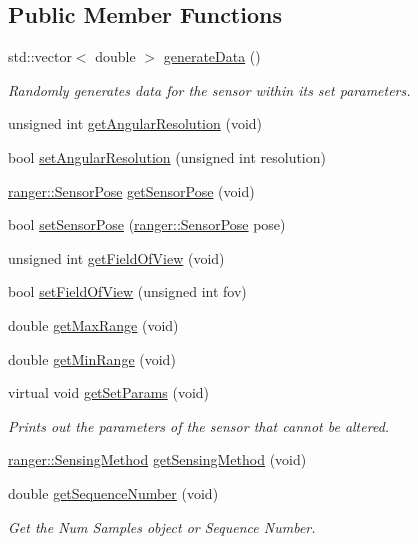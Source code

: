 \subsection*{Public Member Functions}
\begin{DoxyCompactItemize}
\item 
std\+::vector$<$ double $>$ \hyperlink{classRanger_a2b76dc3e21da8a7abac830d09fa81241}{generate\+Data} ()
\begin{DoxyCompactList}\small\item\em Randomly generates data for the sensor within its set parameters. \end{DoxyCompactList}\item 
unsigned int \hyperlink{classRanger_a95b5013ae191d1e19b93fab002306718}{get\+Angular\+Resolution} (void)
\item 
bool \hyperlink{classRanger_a3dc62dcba54eefbd7a0f08cbf97d87dc}{set\+Angular\+Resolution} (unsigned int resolution)
\item 
\hyperlink{structranger_1_1SensorPose}{ranger\+::\+Sensor\+Pose} \hyperlink{classRanger_aec1e730fbf4b46b01b08f6655152fc39}{get\+Sensor\+Pose} (void)
\item 
bool \hyperlink{classRanger_aa55ad45d83b8c095a495677ac8873f2b}{set\+Sensor\+Pose} (\hyperlink{structranger_1_1SensorPose}{ranger\+::\+Sensor\+Pose} pose)
\item 
unsigned int \hyperlink{classRanger_a4bca7dce56b7959257d90b1f30bf0271}{get\+Field\+Of\+View} (void)
\item 
bool \hyperlink{classRanger_afb5d392ca450bcce295e61c121d09157}{set\+Field\+Of\+View} (unsigned int fov)
\item 
double \hyperlink{classRanger_aba5e81260e55089d9ff869051156a722}{get\+Max\+Range} (void)
\item 
double \hyperlink{classRanger_a646a06d3916179b9ebc4502bad169eec}{get\+Min\+Range} (void)
\item 
\mbox{\label{classRanger_a1f130ca82371febca9777a07f1a6a3e6}} 
virtual void \hyperlink{classRanger_a1f130ca82371febca9777a07f1a6a3e6}{get\+Set\+Params} (void)
\begin{DoxyCompactList}\small\item\em Prints out the parameters of the sensor that cannot be altered. \end{DoxyCompactList}\item 
\hyperlink{namespaceranger_ab04465c229cc50595ffe40a891a3b135}{ranger\+::\+Sensing\+Method} \hyperlink{classRanger_a47e30b7ec55adec5bb542278ccfee140}{get\+Sensing\+Method} (void)
\item 
double \hyperlink{classRanger_a1cad662a106b1df8729846ea256f40c8}{get\+Sequence\+Number} (void)
\begin{DoxyCompactList}\small\item\em Get the Num Samples object or Sequence Number. \end{DoxyCompactList}\end{DoxyCompactItemize}
